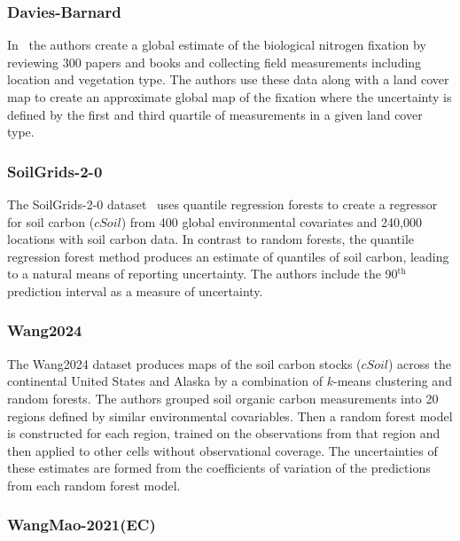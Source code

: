 \documentclass{agujournal}
\begin{document}
\subsubsection{Davies-Barnard}\label{s:fbnf}

In~\cite{DaviesBarnard_GBC_20200209} the authors create a global estimate of the biological nitrogen fixation by reviewing 300 papers and books and collecting field measurements including location and vegetation type. The authors use these data along with a land cover map to create an approximate global map of the fixation where the uncertainty is defined by the first and third quartile of measurements in a given land cover type.

\subsubsection{SoilGrids-2-0}\label{s:soilgrids2}

The SoilGrids-2-0 dataset~\cite{Poggio_SOIL_20210614} uses quantile regression forests to create a regressor for soil carbon ($\mathit{cSoil}$) from 400 global environmental covariates and 240,000 locations with soil carbon data. In contrast to random forests, the quantile regression forest method produces an estimate of quantiles of soil carbon, leading to a natural means of reporting uncertainty. The authors include the 90$^{\mathrm{th}}$ prediction interval as a measure of uncertainty.

\subsubsection{Wang2024}\label{s:wang}

The Wang2024 dataset \cite{Wang_JGRB_20240201,Wang_Wang2024_20230619} produces maps of the soil carbon stocks ($\mathit{cSoil}$) across the continental United States and Alaska by a combination of $k$-means clustering and random forests. The authors grouped soil organic carbon measurements into 20 regions defined by similar environmental covariables. Then a random forest model is constructed for each region, trained on the observations from that region and then applied to other cells without observational coverage. The uncertainties of these estimates are formed from the coefficients of variation of the predictions from each random forest model.

\subsubsection{WangMao-2021(EC)}\label{s:ec}
\end{document}
